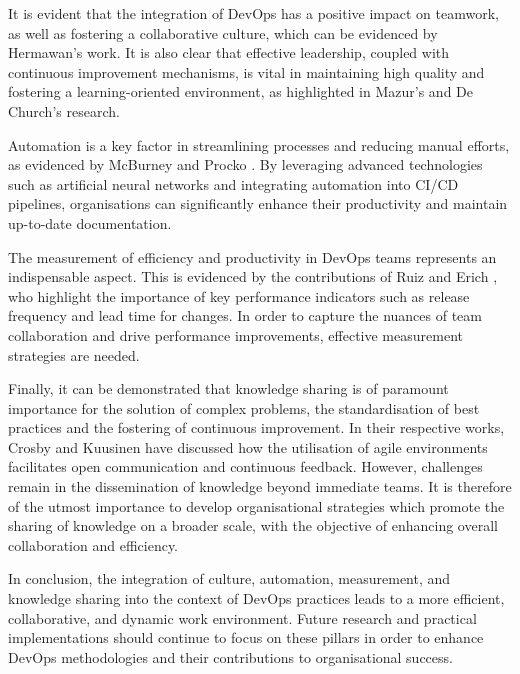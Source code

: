 It is evident that the integration of \ac{DevOps} has a positive impact on teamwork, as well as fostering a collaborative culture, which can be evidenced by Hermawan’s \cite{Hermawan2021DevOpsTeamwork} work. It is also clear that effective leadership, coupled with continuous improvement mechanisms, is vital in maintaining high quality and fostering a learning-oriented environment, as highlighted in Mazur’s \cite{Mazur2023} and De Church’s \cite{Dechurch2010} research.

Automation is a key factor in streamlining processes and reducing manual efforts, as evidenced by McBurney \cite{McBurney2017PrioritizingDocEffort} and Procko \cite{Procko2024CodeDocumentation}. By leveraging advanced technologies such as artificial neural networks and integrating automation into \ac{CI}/\ac{CD} pipelines, organisations can significantly enhance their productivity and maintain up-to-date documentation.

The measurement of efficiency and productivity in \ac{DevOps} teams represents an indispensable aspect. This is evidenced by the contributions of Ruiz \cite{Ruiz2023} and Erich \cite{Erich2017DevOps}, who highlight the importance of key performance indicators such as release frequency and lead time for changes. In order to capture the nuances of team collaboration and drive performance improvements, effective measurement strategies are needed.

Finally, it can be demonstrated that knowledge sharing is of paramount importance for the solution of complex problems, the standardisation of best practices and the fostering of continuous improvement. In their respective works, Crosby \cite{Crosby2023} and Kuusinen \cite{Kuusinen2017} have discussed how the utilisation of agile environments facilitates open communication and continuous feedback. However, challenges remain in the dissemination of knowledge beyond immediate teams. It is therefore of the utmost importance to develop organisational strategies which promote the sharing of knowledge on a broader scale, with the objective of enhancing overall collaboration and efficiency.

In conclusion, the integration of culture, automation, measurement, and knowledge sharing into the context of \ac{DevOps} practices leads to a more efficient, collaborative, and dynamic work environment. Future research and practical implementations should continue to focus on these pillars in order to enhance \ac{DevOps} methodologies and their contributions to organisational success.
